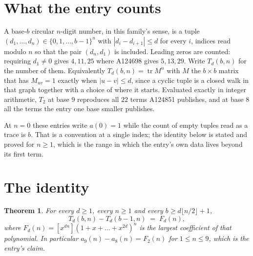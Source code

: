 \documentclass[11pt,a4paper]{article}
\theoremstyle{plain}
\newtheorem{theorem}{Theorem}
\theoremstyle{definition}
\begin{document}
\section{What the entry counts}

A base-$b$ circular $n$-digit number, in this family's sense, is a tuple
$(d_1,\dots,d_n)\in\{0,1,\dots,b-1\}^{n}$ with $|d_i-d_{i+1}|\le d$ for every $i$, indices
read modulo $n$ so that the pair $(d_n,d_1)$ is included. Leading zeros are counted: requiring
$d_1\ne0$ gives $4,11,25$ where A124698 gives $5,13,29$. Write $T_d(b,n)$ for the number of
them. Equivalently $T_d(b,n)=\operatorname{tr}M^{n}$ with $M$ the $b\times b$ matrix that has
$M_{uv}=1$ exactly when $|u-v|\le d$, since a cyclic tuple is a closed walk in that graph
together with a choice of where it starts. Evaluated exactly in integer arithmetic, $T_{2}$
at base $9$ reproduces all $22$ terms A124851 publishes, and at base $8$ all the
terms the entry one base smaller publishes.

At $n=0$ these entries write $a(0)=1$ while the count of empty tuples read as a trace is $b$.
That is a convention at a single index; the identity below is stated and proved for $n\ge1$,
which is the range in which the entry's own data lives beyond its first term.

\section{The identity}

\begin{theorem}
For every $d\ge1$, every $n\ge1$ and every $b\ge d\lfloor n/2\rfloor+1$,
\[
T_d(b,n)-T_d(b-1,n)\;=\;F_d(n),
\]
where $F_d(n)=[x^{dn}](1+x+\dots+x^{2d})^{n}$ is the largest coefficient of that
polynomial. In particular $a_{9}(n)-a_{8}(n)=F_{2}(n)$ for $1\le n\le9$, which
is the entry's claim.
\end{theorem}
\end{document}
